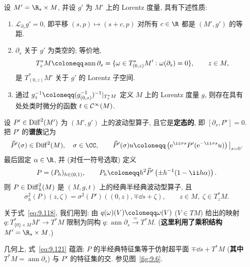 \begin{proposition}[高能波动算子的谱族]\label{prop:9.42}
设 $M' = \R_s \times M$, 并设 $g'$ 为 $M'$ 上的 Lorentz 度量, 具有下述性质:
\begin{enumerate}
    \item $\mathcal{L}_{\partial_s} g' = 0$, 即平移 $(s, p) \mapsto (s + c, p)$ 对所有 $c \in \R$ 都是 $(M', g')$ 的等距.
    \item $\partial_s$ 关于 $g'$ 为类空的; 等价地,
    \begin{equation}\label{eq:9.118}
        T_z^* M \defeq \operatorname{ann} \partial_s = \{\omega \in T_{(0,z)}^* M' : \omega(\partial_s) = 0\}, \qquad z \in M,
    \end{equation}
    是 $T_{(0,z)}^* M'$ 关于 $g'$ 的 Lorentz 子空间.
    \item 通过 $g_z^{-1} \defeq (g_{(0,z)}^{-1})^{-1}|_{T_z^* M}$ 定义 $M$ 上的 Lorentz 度量 $g$, 则存在具有处处类时微分的函数 $t \in \mathcal{C}^\infty(M)$.
\end{enumerate}
设 $P' \in \operatorname{Diff}^2(M')$ 为 $(M', g')$ 上的波动型算子, 且它是\textbf{定态的}, 即 $[\partial_s, P'] = 0$. 把 $P'$ 的\textbf{谱族}记为
\begin{equation}\label{eq:9.119}
    \widehat{P}'(\sigma) \in \Diff^2(M), \quad \sigma \in \CC, \qquad \widehat{P}'(\sigma) u \defeq \left( \ee^{\ii \sigma s} P'(\ee^{-\ii \sigma s} u) \right)\big|_{s=0}.
\end{equation}
最后固定 $\alpha \in \R$, 并 (对任一符号选取) 定义
\begin{equation}\label{eq:9.120}
    P = (P_h)_{h \in (0,1)}, \qquad P_h \defeq h^2 \widehat{P}'\left( \pm h^{-1}(1 - \ii h \alpha) \right).
\end{equation}
则 $P \in \operatorname{Diff}_h^2(M)$ 是 $(M, g, t)$ 上的经典半经典波动型算子, 且
\begin{equation}\label{eq:9.121}
    \sigma_h^2(P)(z, \zeta) = \sigma^2(P')((0, z), \mp \dd s + \zeta), \qquad z \in M, \; \zeta \in T_z^* M.
\end{equation}
\end{proposition}

关于式~\eqref{eq:9.118}, 我们用到: 由 $q(\omega)(V) \defeq \omega(V)$ ($V \in TM$) 给出的映射 $q \colon T_{\{0\} \times M}^* M' \to T^* M$ 限制为同构 $q \colon \operatorname{ann} \partial_s \xrightarrow{\simeq} T^* M$. (\textbf{这里利用了乘积结构} $M' = \R_s \times M$.)

几何上, 式~\eqref{eq:9.121} 蕴涵: $P$ 的半经典特征集等于仿射超平面 $\mp \dd s + T^* M$ (\textbf{其中} $T^* M = \operatorname{ann} \partial_s$) 与 $P'$ 的特征集的交. 参见图~\ref{fig:9.6}.

